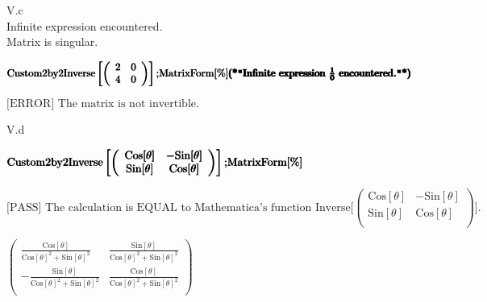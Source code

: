 \documentclass{article}
\begin{document}
V.c\\
Infinite expression encountered.\\
Matrix is singular.

\begin{doublespace}
\noindent\(\pmb{\text{Custom2by2Inverse}\left[\left(
\begin{array}{cc}
 2 & 0 \\
 4 & 0 \\
\end{array}
\right)\right];}\\
\pmb{\text{MatrixForm}[\%]}\\
\pmb{\pmb{\text{(*}\text{$\texttt{"}$Infinite expression }\frac{1}{0}\text{ encountered.$\texttt{"}$}\text{*)}}}\)
\end{doublespace}

\noindent\(\text{[ERROR] The matrix is not invertible.}\)

V.d

\begin{doublespace}
\noindent\(\pmb{\text{Custom2by2Inverse}\left[\left(
\begin{array}{cc}
 \text{Cos}[\theta ] & -\text{Sin}[\theta ] \\
 \text{Sin}[\theta ] & \text{Cos}[\theta ] \\
\end{array}
\right)\right];}\\
\pmb{\text{MatrixForm}[\%]}\)
\end{doublespace}

\noindent\(\text{[PASS] The calculation is EQUAL to Mathematica's function Inverse[}\left(
\begin{array}{cc}
 \text{Cos}[\theta ] & -\text{Sin}[\theta ] \\
 \text{Sin}[\theta ] & \text{Cos}[\theta ] \\
\end{array}
\right)\text{].}\)

\begin{doublespace}
\noindent\(\left(
\begin{array}{cc}
 \frac{\text{Cos}[\theta ]}{\text{Cos}[\theta ]^2+\text{Sin}[\theta ]^2} & \frac{\text{Sin}[\theta ]}{\text{Cos}[\theta ]^2+\text{Sin}[\theta ]^2}
\\
 -\frac{\text{Sin}[\theta ]}{\text{Cos}[\theta ]^2+\text{Sin}[\theta ]^2} & \frac{\text{Cos}[\theta ]}{\text{Cos}[\theta ]^2+\text{Sin}[\theta ]^2}
\\
\end{array}
\right)\)
\end{doublespace}
\end{document}
